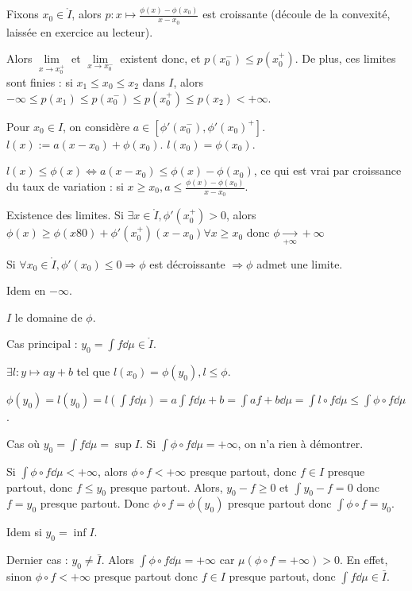 \documentclass[10pt,a4paper,notitlepage ]{report}
\begin{document}
\begin{demo}
	Fixons $x_0 \in \mathring I$, alors $p:x\mapsto \frac{\phi(x) - \phi(x_0)}{x-x_0}$ est croissante (découle de la convexité, laissée en exercice au lecteur).
	
	Alors $\underset{x\rightarrow x_0^+} \lim $ et $\underset{x \rightarrow x_0^-}\lim $ existent donc, et $p(x_0^-) \le p(x_0^+)$. De plus, ces limites sont finies : si $x_1 \le x_0 \le x_2$ dans $I$, alors $-\infty\le p(x_1) \le p(x_0^-) \le p(x_0^+) \le p(x_2) < +\infty$.
	
	Pour $x_0 \in I$, on considère $a\in [\phi'(x_0^-), \phi'(x_0)^+]$.
	$l(x) := a(x-x_0) +\phi(x_0)$. $l(x_0) = \phi(x_0)$.
	
	$l(x) \le \phi(x) \Leftrightarrow a(x - x_0) \le \phi(x) - \phi(x_0)$, ce qui est vrai par croissance du taux de variation : si $x\ge x_0, a\le \frac{\phi(x)-\phi(x_0)}{x-x_0}$.
	
	Existence des limites.
	Si $\exists x\in \mathring I, \phi'(x_0^+) > 0$, alors $\phi(x) \ge \phi(x80) + \phi'(x_0^+)(x-x_0) \forall x\ge x_0$ donc $\phi \underset {+\infty} \rightarrow +\infty$
	
	Si $\forall x_0 \in \mathring I, \phi'(x_0) \le 0 \Rightarrow \phi$ est décroissante $\Rightarrow \phi$ admet une limite.
	
	Idem en $-\infty$.
\end{demo}

\begin{demo}[Jensen]
	$I$ le domaine de $\phi$.
	
	Cas principal : $y_0 = \int f\dd\mu \in \mathring I$.
	
	$\exists l : y \mapsto ay+b$ tel que $l(x_0) = \phi(y_0), l\le \phi$.
	
	$\phi(y_0) = l(y_0) = l\left(\int f\dd\mu\right) = a \int f\dd\mu + b = \int af+b\dd\mu = \int l\circ f \dd\mu \le \int \phi\circ f \dd\mu$.
	
	Cas où $y_0 = \int f\dd\mu = \sup I$. Si $\int \phi \circ f \dd\mu = +\infty$, on n'a rien à démontrer.
	
	Si $\int \phi\circ f \dd\mu < + \infty$, alors $\phi\circ f < +\infty$ presque partout, donc $f\in I$ presque partout, donc $f\le y_0$ presque partout. Alors, $y_0-f \ge 0$ et $\int y_0-f = 0$ donc $f=y_0$ presque partout. Donc $\phi\circ f = \phi(y_0)$ presque partout donc $\int \phi \circ f = y_0$.
	
	Idem si $y_0 = \inf I$.
	
	Dernier cas : $y_0 \neq \bar I$.
	Alors $\int \phi \circ f \dd \mu = +\infty$ car $\mu(\phi\circ f = +\infty) > 0$. En effet, sinon $\phi\circ f < +\infty$ presque partout donc $f\in I$ presque partout, donc $\int f\dd\mu \in \bar I$.
\end{demo}
\end{document}
